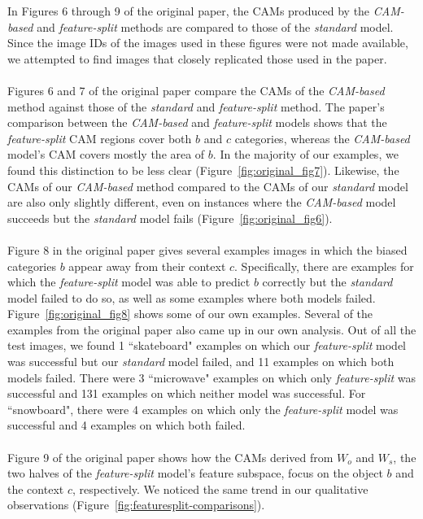 In Figures 6 through 9 of the original paper, the CAMs produced by the \textit{CAM-based} and \textit{feature-split} methods are compared to those of the \textit{standard} model. Since the image IDs of the images used in these figures were not made available, we attempted to find images that closely replicated those used in the paper.\\
\\
Figures 6 and 7 of the original paper compare the CAMs of the \textit{CAM-based} method against those of the \textit{standard} and \textit{feature-split} method. The paper's comparison between the \textit{CAM-based} and \textit{feature-split} models shows that the \textit{feature-split} CAM regions cover both $b$ and $c$ categories, whereas the \textit{CAM-based} model's CAM covers mostly the area of $b$. In the majority of our examples, we found this distinction to be less clear (Figure~\ref{fig:original_fig7}). Likewise, the CAMs of our \textit{CAM-based} method compared to the CAMs of our \textit{standard} model are also only slightly different, even on instances where the \textit{CAM-based} model succeeds but the \textit{standard} model fails (Figure~\ref{fig:original_fig6}).\\
\\
Figure 8 in the original paper gives several examples images in which the biased categories $b$ appear away from their context $c$. Specifically, there are examples for which the \textit{feature-split} model was able to predict $b$ correctly but the \textit{standard} model failed to do so, as well as some examples where both models failed. Figure~\ref{fig:original_fig8} shows some of our own examples. Several of the examples from the original paper also came up in our own analysis. Out of all the test images, we found 1 ``skateboard" examples on which our \textit{feature-split} model was successful but our \textit{standard} model failed, and 11 examples on which both models failed. There were 3 ``microwave" examples on which only \textit{feature-split} was successful and 131 examples on which neither model was successful. For ``snowboard", there were 4 examples on which only the \textit{feature-split} model was successful and 4 examples on which both failed.\\
\\
Figure 9 of the original paper shows how the CAMs derived from $W_o$ and $W_s$, the two halves of the \textit{feature-split} model's feature subspace, focus on the object $b$ and the context $c$, respectively. We noticed the same trend in our qualitative observations (Figure~\ref{fig:featuresplit-comparisons}).

